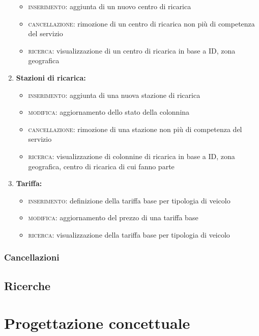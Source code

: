 \documentclass{article}
\begin{document}
\begin{enumerate}
    \begin{itemize}
        \item \textsc{inserimento:} aggiunta di un nuovo centro di ricarica
        \item \textsc{cancellazione:} rimozione di un centro di ricarica non più di competenza del servizio
        \item \textsc{ricerca:} visualizzazione di un centro di ricarica in base a ID, zona geografica
    \end{itemize}
    \item \textbf{Stazioni di ricarica:}
    \begin{itemize}
        \item \textsc{inserimento:} aggiunta di una nuova stazione di ricarica
        \item \textsc{modifica:} aggiornamento dello stato della colonnina
        \item \textsc{cancellazione:} rimozione di una stazione non più di competenza del servizio
        \item \textsc{ricerca:} visualizzazione di colonnine di ricarica in base a ID, zona geografica, centro di ricarica di cui fanno parte
    \end{itemize}
    \item \textbf{Tariffa:}
    \begin{itemize}
        \item \textsc{inserimento:} definizione della tariffa base per tipologia di veicolo
        \item \textsc{modifica:} aggiornamento del prezzo di una tariffa base
        \item \textsc{ricerca:} visualizzazione della tariffa base per tipologia di veicolo
    \end{itemize}
\end{enumerate}

\subsubsection{Cancellazioni}

\subsection{Ricerche}


\section{Progettazione concettuale}
\end{document}
